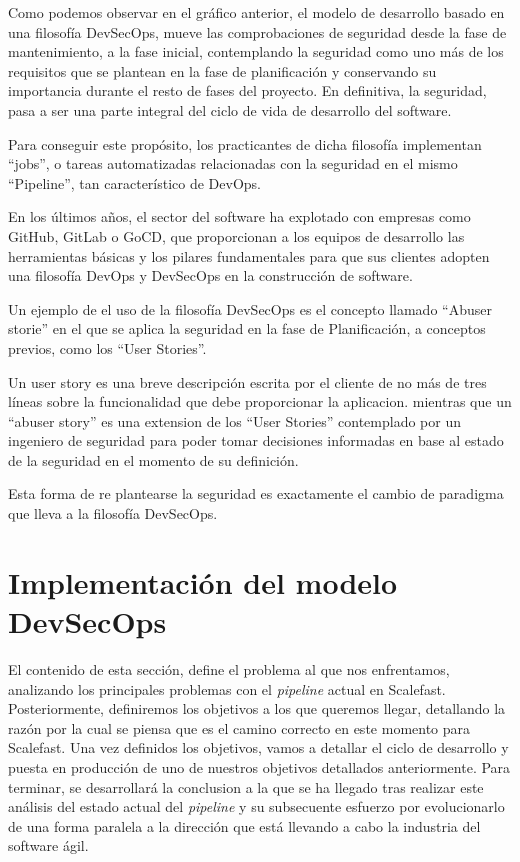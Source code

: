 \documentclass[12pt]{report} %
\begin{document}
Como podemos observar en el gráfico anterior, el modelo de desarrollo basado en una filosofía DevSecOps, mueve las comprobaciones de seguridad desde la fase de mantenimiento, a la fase inicial, contemplando la seguridad como uno más de los requisitos que se plantean en la fase de planificación y conservando su importancia durante el resto de fases del proyecto.
En definitiva, la seguridad, pasa a ser una parte integral del ciclo de vida de desarrollo del software. 

Para conseguir este propósito, los practicantes de dicha filosofía implementan ``jobs'', o tareas automatizadas relacionadas con la seguridad en el mismo ``Pipeline'', tan característico de DevOps.

En los últimos años, el sector del software ha explotado con empresas como GitHub, GitLab o GoCD, que proporcionan a los equipos de desarrollo las herramientas básicas y los pilares fundamentales para que sus clientes adopten una filosofía DevOps y DevSecOps en la construcción de software.\cite{Google2019}

Un ejemplo de el uso de la filosofía DevSecOps es el concepto llamado ``Abuser storie'' \cite{Bor2006} en el que se aplica la seguridad en la fase de Planificación, a conceptos previos, como los ``User Stories''.

Un user story es una breve descripción escrita por el cliente de no más de tres líneas sobre la funcionalidad que debe proporcionar la aplicacion.  \cite{XPUserStory} mientras que un ``abuser story'' es una extension de los ``User Stories'' contemplado por un ingeniero de seguridad para poder tomar decisiones informadas en base al estado de la seguridad en el momento de su definición. \cite{Bor2006}

Esta forma de re plantearse la seguridad es exactamente el cambio de paradigma que lleva a la filosofía DevSecOps.


\chapter{Implementación del modelo DevSecOps}

El contenido de esta sección, define el problema al que nos enfrentamos, analizando los principales problemas con el \textit{\gls{pipeline}} actual en Scalefast.
Posteriormente, definiremos los objetivos a los que queremos llegar, detallando la razón por la cual se piensa que es el camino correcto en este momento para Scalefast.
Una vez definidos los objetivos, vamos a detallar el ciclo de desarrollo y puesta en producción de uno de nuestros objetivos detallados anteriormente.
Para terminar, se desarrollará la conclusion a la que se ha llegado tras realizar este análisis del estado actual del \textit{\gls{pipeline}} y su subsecuente esfuerzo por evolucionarlo de una forma paralela a la dirección que está llevando a cabo la industria del software ágil.
\end{document}
